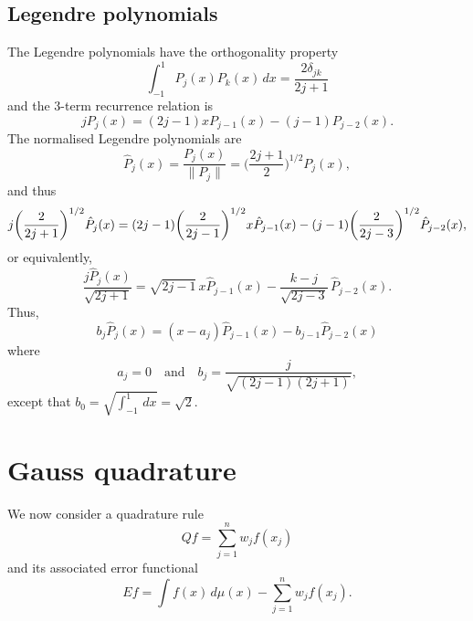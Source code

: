 \documentclass[12pt,a4paper]{article}
\begin{document}
\subsection{Legendre polynomials}
The Legendre polynomials have the orthogonality property
\begin{equation}\label{eq: legendre orthog}
\int_{-1}^1 P_j(x)P_k(x)\,dx=\frac{2\delta_{jk}}{2j+1}
\end{equation}
and the 3-term recurrence relation is
\begin{equation}\label{eq: legendre 3 term}
jP_j(x)=(2j-1)xP_{j-1}(x)-(j-1)P_{j-2}(x).
\end{equation}
The normalised Legendre polynomials are
\[
\hat P_j(x)=\frac{P_j(x)}{\|P_j\|}=\biggl(\frac{2j+1}{2}\biggr)^{1/2}
	P_j(x),
\]
and thus
\[
j\biggl(\frac{2}{2j+1}\biggr)^{1/2}\hat P_j(x)
	=(2j-1)\biggl(\frac{2}{2j-1}\biggr)^{1/2}x\hat P_{j-1}(x)\\
	-(j-1)\biggl(\frac{2}{2j-3}\biggr)^{1/2}\hat P_{j-2}(x),
\]
or equivalently,
\[
\frac{j\hat P_j(x)}{\sqrt{2j+1}}=\sqrt{2j-1}\,x\hat P_{j-1}(x)
	-\frac{k-j}{\sqrt{2j-3}}\,\hat P_{j-2}(x).
\]
Thus, 
\[
b_j\hat P_j(x)=(x-a_j)\hat P_{j-1}(x)-b_{j-1}\hat P_{j-2}(x)
\]
where
\[
a_j=0\quad\text{and}\quad b_j=\frac{j}{\sqrt{(2j-1)(2j+1)}},
\]
except that $b_0=\sqrt{\int_{-1}^1\,dx}=\sqrt{2}$.

\section{Gauss quadrature}
We now consider a quadrature rule
\begin{equation}\label{eq: Qf}
Qf=\sum_{j=1}^n w_jf(x_j)
\end{equation}
and its associated error functional
\[
Ef=\int f(x)\,d\mu(x)-\sum_{j=1}^n w_jf(x_j).
\]
\end{document}
